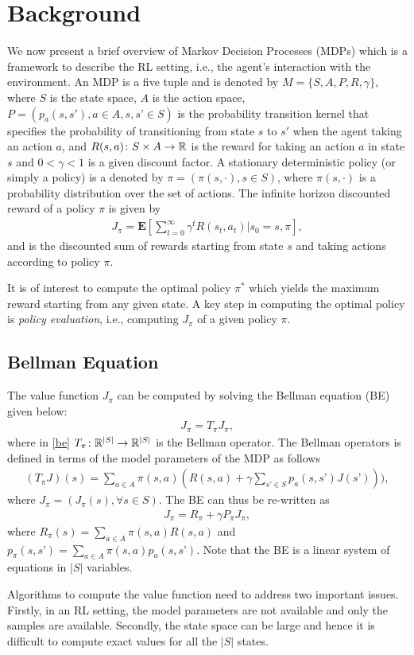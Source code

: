 \section{Background}
We now present a brief overview of Markov Decision Processes (MDPs) which is a framework to describe the RL setting, i.e., the agent's interaction with the environment. An MDP is a five tuple and is denoted by $M=\{S,A,P,R,\gamma\}$, where $S$ is the state space, $A$ is the action space, $P=(p_a(s,s'),a\in A,s,s’\in S)$ is the probability transition kernel that specifies the probability of transitioning from state $s$ to $s'$ when the agent taking an action $a$, and $R(s,a)\colon S\times A\rightarrow \mathbb{R}$ is the reward for taking an action $a$ in state $s$ and $0<\gamma<1$ is a given discount factor. A stationary deterministic policy (or simply a policy) is a denoted by $\pi=(\pi(s,\cdot),s\in S)$, where $\pi(s,\cdot)$ is a probability distribution over the set of actions. The infinite horizon discounted reward of a policy $\pi$ is given by
\begin{align}
J_\pi=\mathbf{E}[\sum_{t=0}^\infty \gamma^t R(s_t,a_t)| s_0=s, \pi],
\end{align}
and is the discounted sum of rewards starting from state $s$ and taking actions according to policy $\pi$.\par
It is of interest to compute the optimal policy $\pi^*$ which yields the maximum reward starting from any given state. A key step in computing the optimal policy is \emph{policy evaluation}, i.e.,  computing $J_\pi$ of a given policy $\pi$.\par
\subsection{Bellman Equation}
The value function $J_\pi$ can be computed by solving the Bellman equation (BE) given below:
\begin{align}\label{be}
J_\pi=T_\pi J_\pi,
\end{align}
where in \eqref{be} $T_\pi\colon \mathbb{R}^{|S|}\rightarrow \mathbb{R}^{|S|}$ is the Bellman operator. The Bellman operators is defined in terms of the model parameters of the MDP as follows
\begin{align}\label{bo}
(T_\pi J)(s)=\sum_{a\in A}\pi(s,a)(R(s,a)+\gamma \sum_{s’\in S}p_a(s,s’) J(s’))),
\end{align}
where $J_\pi=(J_\pi(s),\forall s\in S)$. The BE can thus be re-written as 
\begin{align}\label{be}
J_\pi=R_\pi+\gamma P_\pi J_\pi,
\end{align}
where $R_\pi(s)=\sum_{a\in A}\pi(s,a) R(s,a)$ and $p_\pi(s,s’)=\sum_{a\in A}\pi(s,a)p_a(s,s’)$. Note that the BE is a linear system of equations in $|S|$ variables.\par
Algorithms to compute the value function need to address two important issues. Firstly, in an RL setting, the model parameters are not available and only the samples are available. Secondly, the state space can be large and hence it is difficult to compute exact values for all the $|S|$ states.
